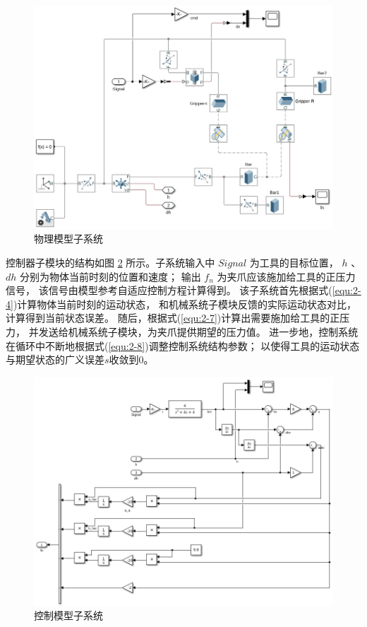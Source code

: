 \begin{figure}[!ht]
  \centering
  \includegraphics[scale=0.6]{chapter03/pic/3-5}
  \caption{物理模型子系统}
  \label{fig:3-5}
  \vspace{-0.3cm}
\end{figure}

控制器子模块的结构如图 \ref{fig:3-6} 所示。子系统输入中 $Signal$ 为工具的目标位置，
$h$ 、$dh$ 分别为物体当前时刻的位置和速度；
输出 $f_n$ 为夹爪应该施加给工具的正压力信号，
该信号由模型参考自适应控制方程计算得到。
该子系统首先根据式(\ref{equ:2-4})计算物体当前时刻的运动状态，
和机械系统子模块反馈的实际运动状态对比，计算得到当前状态误差。
随后，根据式(\ref{equ:2-7})计算出需要施加给工具的正压力，
并发送给机械系统子模块，为夹爪提供期望的压力值。
进一步地，控制系统在循环中不断地根据式(\ref{equ:2-8})调整控制系统结构参数；
以使得工具的运动状态与期望状态的广义误差$s$收敛到0。

\begin{figure}[!ht]
  \centering
  \includegraphics[scale=0.55]{chapter03/pic/3-6}
  \caption{控制模型子系统}
  \label{fig:3-6}
  \vspace{-0.3cm}
\end{figure}

